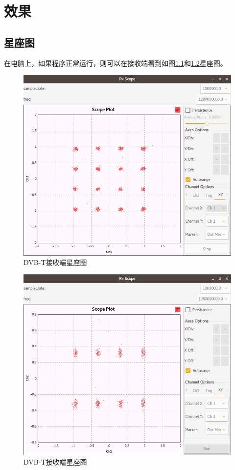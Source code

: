 \chapter{效果}
	\section{星座图}
		\par 在电脑上，如果程序正常运行，则可以在接收端看到如图\ref{fig:dvbt_rx_map_1}和\ref{fig:dvbt_rx_map_2}星座图。
		\begin{figure}[htp]
			\centering
			\includegraphics[width=13cm]{figures/dvbt_rx_map_1.png}
			\caption{DVB-T接收端星座图}
			\label{fig:dvbt_rx_map_1}
		\end{figure}
		\begin{figure}[htp]
			\centering
			\includegraphics[width=13cm]{figures/dvbt_rx_map_2.png}
			\caption{DVB-T接收端星座图}
			\label{fig:dvbt_rx_map_2}
		\end{figure}
